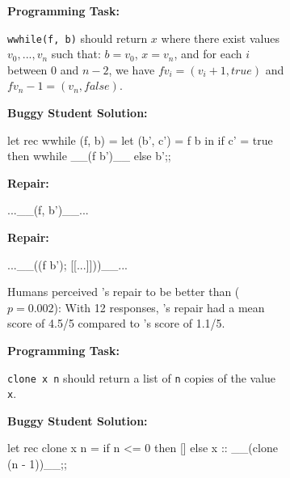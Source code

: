 
\begin{figure}
\begin{subfigure}[t]{.38\textwidth}
\begin{center}
\textbf{Programming Task:}
\end{center}
\texttt{wwhile(f, b)} should return $x$ where
there exist values $v_0,...,v_n$ such that:
$b = v_0$, $x = v_n$, and
for each $i$ between 0 and $n-2$, we have $f v_i = (v_i+1, true)$
and $f v_n-1 = (v_n, false)$.
\begin{center}
\textbf{Buggy Student Solution:}
\end{center}
\begin{compactcode}
let rec wwhile (f, b) =
let (b', c') = f b in if c' = true
then wwhile __(f b')__ else b';;
\end{compactcode}
\begin{center}
\textbf{\toolname Repair:}
\end{center}
\begin{compactcode}
           ...__(f, b')__...
\end{compactcode}
\begin{center}
\textbf{\seminal Repair:}
\end{center}
\begin{compactcode}
     ...__((f b'); [[...]]))__...
\end{compactcode}
\caption{Humans perceived \toolname's repair to be
better than \seminal ($p=0.002$): With 12 responses, \toolname's
repair had a mean score of 4.5/5 compared to \seminal's
score of 1.1/5.}
\label{subfig:good1}
\end{subfigure}\hfill
\begin{subfigure}[t]{.1\textwidth}
\end{subfigure}\hfill
\begin{subfigure}[t]{.28\textwidth}
\begin{center}
\textbf{Programming Task:}
\end{center}
\texttt{clone x n} should return a list of
\texttt{n} copies of the value \texttt{x}.
\begin{center}
\textbf{Buggy Student Solution:}
\end{center}
\begin{compactcode}
let rec clone x n =
if n <= 0 then []
else x :: __(clone (n - 1))__;;
\end{compactcode}
\begin{center}

\end{center}
\end{subfigure}
\end{figure}
